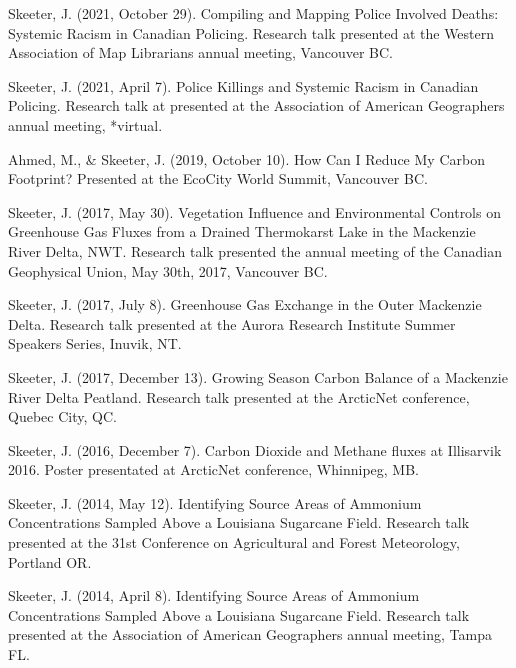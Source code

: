 \documentclass[
]{article}
\newlength{\cslhangindent}
\newlength{\cslentryspacingunit} %
\newenvironment{CSLReferences}[2] %
 {%
  \setlength{\parindent}{0pt}
  \ifodd #1
  \let\oldpar\par
  \def\par{\hangindent=\cslhangindent\oldpar}
  \fi
  \setlength{\parskip}{#2\cslentryspacingunit}
 }%
 {}
\begin{document}
\hypertarget{refs-4.1}{}
\begin{CSLReferences}{1}{0}
\leavevmode{}%
Skeeter, J. (2021, October 29). Compiling and {Mapping} {Police}
{Involved} {Deaths}: {Systemic} {Racism} in {Canadian} {Policing}.
Research talk presented at the Western Association of Map Librarians
annual meeting, Vancouver BC.

\leavevmode{}%
Skeeter, J. (2021, April 7). Police {Killings} and {Systemic} {Racism}
in {Canadian} {Policing}. Research talk at presented at the Association
of American Geographers annual meeting, *virtual.

\leavevmode{}%
Ahmed, M., \& Skeeter, J. (2019, October 10). How {Can} {I} {Reduce}
{My} {Carbon} {Footprint}? Presented at the EcoCity World Summit,
Vancouver BC.

\leavevmode{}%
Skeeter, J. (2017, May 30). Vegetation {Influence} and {Environmental}
{Controls} on {Greenhouse} {Gas} {Fluxes} from a {Drained} {Thermokarst}
{Lake} in the {Mackenzie} {River} {Delta}, {NWT}. Research talk
presented the annual meeting of the Canadian Geophysical Union, May
30th, 2017, Vancouver BC.

\leavevmode{}%
Skeeter, J. (2017, July 8). Greenhouse {Gas} {Exchange} in the {Outer}
{Mackenzie} {Delta}. Research talk presented at the Aurora Research
Institute Summer Speakers Series, Inuvik, NT.

\leavevmode{}%
Skeeter, J. (2017, December 13). Growing {Season} {Carbon} {Balance} of
a {Mackenzie} {River} {Delta} {Peatland}. Research talk presented at the
ArcticNet conference, Quebec City, QC.

\leavevmode{}%
Skeeter, J. (2016, December 7). Carbon {Dioxide} and {Methane} fluxes at
{Illisarvik} 2016. Poster presentated at ArcticNet conference,
Whinnipeg, MB.

\leavevmode{}%
Skeeter, J. (2014, May 12). Identifying {Source} {Areas} of {Ammonium}
{Concentrations} {Sampled} {Above} a {Louisiana} {Sugarcane} {Field}.
Research talk presented at the 31st Conference on Agricultural and
Forest Meteorology, Portland OR.

\leavevmode{}%
Skeeter, J. (2014, April 8). Identifying {Source} {Areas} of {Ammonium}
{Concentrations} {Sampled} {Above} a {Louisiana} {Sugarcane} {Field}.
Research talk presented at the Association of American Geographers
annual meeting, Tampa FL.


\end{CSLReferences}
\end{document}
